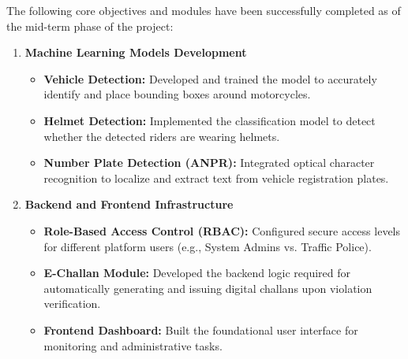 The following core objectives and modules have been successfully completed as of the mid-term phase of the project:

\begin{enumerate}
    \item \textbf{Machine Learning Models Development}
    \begin{itemize}
        \item \textbf{Vehicle Detection:} Developed and trained the model to accurately identify and place bounding boxes around motorcycles.
        \item \textbf{Helmet Detection:} Implemented the classification model to detect whether the detected riders are wearing helmets.
        \item \textbf{Number Plate Detection (ANPR):} Integrated optical character recognition to localize and extract text from vehicle registration plates.
    \end{itemize}
    
    \item \textbf{Backend and Frontend Infrastructure}
    \begin{itemize}
        \item \textbf{Role-Based Access Control (RBAC):} Configured secure access levels for different platform users (e.g., System Admins vs. Traffic Police).
        \item \textbf{E-Challan Module:} Developed the backend logic required for automatically generating and issuing digital challans upon violation verification.
        \item \textbf{Frontend Dashboard:} Built the foundational user interface for monitoring and administrative tasks.
    \end{itemize}
\end{enumerate}